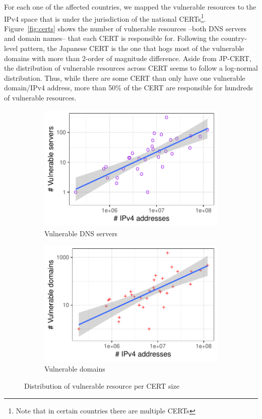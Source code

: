 For each one of the affected countries, we mapped the vulnerable resources to the IPv4 space that is under the jurisdiction of the national CERTs\footnote{Note that in certain countries there are multiple CERTs}. Figure~\ref{fig:certs} shows the number of vulnerable resources --both DNS servers and domain names-- that each CERT is responsible for. 
Following the country-level pattern, the Japanese CERT is the one that hogs most of the vulnerable domains with more than 2-order of magnitude difference. Aside from JP-CERT, the distribution of vulnerable resources across CERT seems to follow a log-normal distribution. Thus, while there are some CERT than only have one vulnerable domain/IPv4 address, more than 50\% of the CERT are responsible for hundreds of vulnerable resources. 
\begin{figure}[!ht]
\centering
\begin{subfigure}[b]{0.45\columnwidth}
    \includegraphics[width=\textwidth]{figs/certs_sizevsservers.pdf}
    \caption{Vulnerable DNS servers}
    \label{fig:size_servers_cert}
    \end{subfigure}
\hfill
\begin{subfigure}[b]{.45\columnwidth}
    \centering
    \includegraphics[width=\textwidth]{figs/certs_sizevsdomains.pdf}
    \caption{Vulnerable domains}
    \label{fig:size_domains_cert}
\end{subfigure}
\caption{Distribution of vulnerable resource per CERT size}
   \label{fig:size_cert}
\end{figure}



